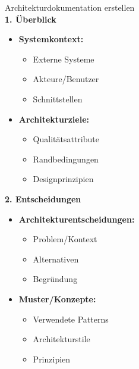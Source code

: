 \begin{KR}{Architekturdokumentation erstellen}\\
\textbf{1. Überblick}
\begin{itemize}
    \item \textbf{Systemkontext:}
    \begin{itemize}
        \item Externe Systeme
        \item Akteure/Benutzer
        \item Schnittstellen
    \end{itemize}
    
    \item \textbf{Architekturziele:}
    \begin{itemize}
        \item Qualitätsattribute
        \item Randbedingungen
        \item Designprinzipien
    \end{itemize}
\end{itemize}

\textbf{2. Entscheidungen}
\begin{itemize}
    \item \textbf{Architekturentscheidungen:}
    \begin{itemize}
        \item Problem/Kontext
        \item Alternativen
        \item Begründung
    \end{itemize}
    
    \item \textbf{Muster/Konzepte:}
    \begin{itemize}
        \item Verwendete Patterns
        \item Architekturstile
        \item Prinzipien
    \end{itemize}
\end{itemize}
\end{KR}

